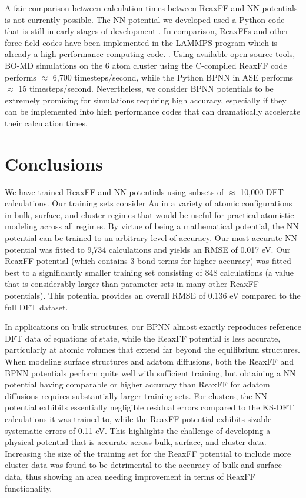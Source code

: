 \documentclass[12pt]{cmuthesis}
\begin{document}
A fair comparison between calculation times between ReaxFF and NN potentials is not currently possible. The NN potential we developed used a Python code that is still in early stages of development \cite{khorshidi-2016-amp}. In comparison, ReaxFFs and other force field codes have been implemented in the LAMMPS program which is already a high performance computing code. \cite{plimpton-1995-fast-paral}. Using available open source tools, BO-MD simulations on the 6 atom cluster using the C-compiled ReaxFF code performs \(\approx\) 6,700 timesteps/second, while the Python BPNN in ASE performs \(\approx\) 15 timesteps/second. Nevertheless, we consider BPNN potentials to be extremely promising for simulations requiring high accuracy, especially if they can be implemented into high performance codes that can dramatically accelerate their calculation times.

\section{Conclusions}
\label{sec:orgeca00da}
We have trained ReaxFF and NN potentials using subsets of \(\approx\) 10,000 DFT calculations. Our training sets consider Au in a variety of atomic configurations in bulk, surface, and cluster regimes that would be useful for practical atomistic modeling across all regimes. By virtue of being a mathematical potential, the NN potential can be trained to an arbitrary level of accuracy. Our most accurate NN potential was fitted to 9,734 calculations and yields an RMSE of 0.017 eV. Our ReaxFF potential (which contains 3-bond terms for higher accuracy) was fitted best to a significantly smaller training set consisting of 848 calculations (a value that is considerably larger than parameter sets in many other ReaxFF potentials). This potential provides an overall RMSE of 0.136 eV compared to the full DFT dataset.

In applications on bulk structures, our BPNN almost exactly reproduces reference DFT data of equations of state, while the ReaxFF potential is less accurate, particularly at atomic volumes that extend far beyond the equilibrium structures. When modeling surface structures and adatom diffusions, both the ReaxFF and BPNN potentials perform quite well with sufficient training, but obtaining a NN potential having comparable or higher accuracy than ReaxFF for adatom diffusions requires substantially larger training sets. For clusters, the NN potential exhibits essentially negligible residual errors compared to the KS-DFT calculations it was trained to, while the ReaxFF potential exhibits sizable systematic errors of 0.11 eV. This highlights the challenge of developing a physical potential that is accurate across bulk, surface, and cluster data. Increasing the size of the training set for the ReaxFF potential to include more cluster data was found to be detrimental to the accuracy of bulk and surface data, thus showing an area needing improvement in terms of ReaxFF functionality.
\end{document}
